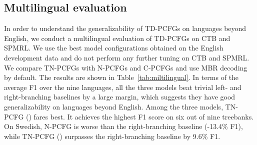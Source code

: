 \documentclass[11pt]{article}
\begin{document}
\subsection{Multilingual evaluation}\label{sec:multilingual}


In order to understand the generalizability of TD-PCFGs on languages beyond English,
we conduct a multilingual evaluation of TD-PCFGs on CTB and SPMRL.
We use the best model configurations obtained on the English development data and do not perform any further tuning on CTB and SPMRL.
We compare TN-PCFGs with N-PCFGs and C-PCFGs and
use MBR decoding by default. The results are shown in Table~\ref{tab:miltilingual}.
In terms of the average F1 over the nine languages,
all the three models beat trivial left- and right-branching baselines by a large margin,
which suggests they have good generalizability on languages beyond English.
Among the three models, TN-PCFG () fares best.
It achieves the highest F1 score on six out of nine treebanks.
On Swedish, N-PCFG is worse than the right-branching baseline (-13.4\% F1),
while TN-PCFG () surpasses the right-branching baseline by 9.6\% F1.
\end{document}
